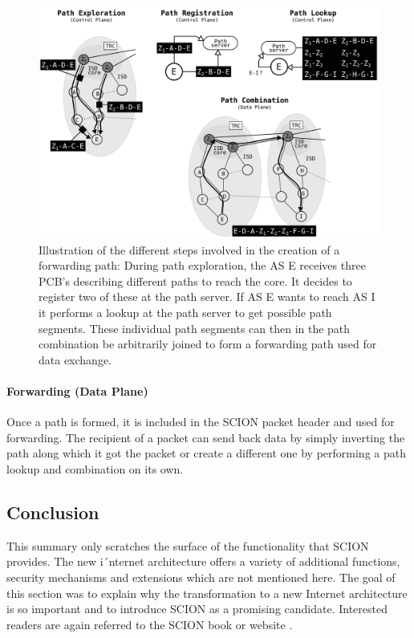 \begin{figure}
	\begin{center}
		\def\svgwidth{1\textwidth}
		\includegraphics[scale=0.24]{../illustrations/importantConcepts/SCIONPathCreation.pdf} 
		\caption[Caption for the list of figures.]{Illustration of the different steps involved in the creation of a forwarding path: During path exploration, the AS E receives three PCB's describing different paths to reach the core. It decides to register two of these at the path server. If AS E wants to reach AS I it performs a lookup at the path server to get possible path segments. These individual path segments can then in the path combination be arbitrarily joined to form a forwarding path used for data exchange.}
		\label{fig:SCIONCreationForwardingPath}
	\end{center}
\end{figure}

\paragraph{Forwarding (Data Plane)}

Once a path is formed, it is included in the SCION packet header and used for forwarding. The recipient of a packet can send back data by simply inverting the path along which it got the packet or create a different one by performing a path lookup and combination on its own.

\subsection*{Conclusion}

This summary only scratches the surface of the functionality that SCION provides. The new i´nternet architecture offers a variety of additional functions, security mechanisms and extensions which are not mentioned here. The goal of this section was to explain why the transformation to a new Internet architecture is so important and to introduce SCION as a promising candidate. Interested readers are again referred to the SCION book \cite{SCIONBook} or website \cite{SCIONWebMain}.